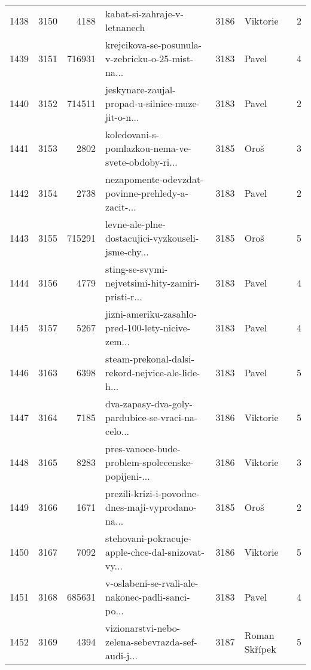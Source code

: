\begin{tabular}{lrrlrlr}
1438 &       3150 &     4188 &                       kabat-si-zahraje-v-letnanech &     3186 &                     Viktorie &               2 \\
1439 &       3151 &   716931 &  krejcikova-se-posunula-v-zebricku-o-25-mist-na... &     3183 &                        Pavel &               4 \\
1440 &       3152 &   714511 &  jeskynare-zaujal-propad-u-silnice-muze-jit-o-n... &     3183 &                        Pavel &               2 \\
1441 &       3153 &     2802 &  koledovani-s-pomlazkou-nema-ve-svete-obdoby-ri... &     3185 &                         Oroš &               3 \\
1442 &       3154 &     2738 &  nezapomente-odevzdat-povinne-prehledy-a-zacit-... &     3183 &                        Pavel &               2 \\
1443 &       3155 &   715291 &  levne-ale-plne-dostacujici-vyzkouseli-jsme-chy... &     3185 &                         Oroš &               5 \\
1444 &       3156 &     4779 &  sting-se-svymi-nejvetsimi-hity-zamiri-pristi-r... &     3183 &                        Pavel &               4 \\
1445 &       3157 &     5267 &  jizni-ameriku-zasahlo-pred-100-lety-nicive-zem... &     3183 &                        Pavel &               4 \\
1446 &       3163 &     6398 &  steam-prekonal-dalsi-rekord-nejvice-ale-lide-h... &     3183 &                        Pavel &               5 \\
1447 &       3164 &     7185 &  dva-zapasy-dva-goly-pardubice-se-vraci-na-celo... &     3186 &                     Viktorie &               5 \\
1448 &       3165 &     8283 &  pres-vanoce-bude-problem-spolecenske-popijeni-... &     3186 &                     Viktorie &               3 \\
1449 &       3166 &     1671 &  prezili-krizi-i-povodne-dnes-maji-vyprodano-na... &     3185 &                         Oroš &               2 \\
1450 &       3167 &     7092 &  stehovani-pokracuje-apple-chce-dal-snizovat-vy... &     3186 &                     Viktorie &               5 \\
1451 &       3168 &   685631 &  v-oslabeni-se-rvali-ale-nakonec-padli-sanci-po... &     3183 &                        Pavel &               4 \\
1452 &       3169 &     4394 &  vizionarstvi-nebo-zelena-sebevrazda-sef-audi-j... &     3187 &                Roman Skřípek &               5 \\

\end{tabular}
